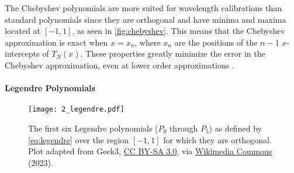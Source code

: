 

The Chebyshev polynomials are more suited for wavelength calibrations than standard polynomials since they are orthogonal and have minima and maxima located at $[-1, 1]$, as seen in \autoref{fig:chebyshev}. This means that the Chebyshev approximation is exact when $x = x_{n}$, where $x_{n}$ are the positions of the $n - 1$ $x$-intercepts of $T_{N}(x)$. These properties greatly minimize the error in the Chebyshev approximation, even at lower order approximations \citep{cheby}.


\paragraph{Legendre Polynomials}

\begin{figure}[t]
    \centering
    \texttt{[image: 2\_legendre.pdf]}
    \caption{The first six Legendre polynomials ($P_0$ through $P_{5}$) as defined by \autoref{eq:legendre} over the region $[-1, 1]$ for which they are orthogonal. Plot adapted from Geek3, \protect\href{https://creativecommons.org/licenses/by-sa/3.0}{CC BY-SA 3.0}, via \protect\href{https://commons.wikimedia.org/wiki/File:Legendrepolynomials6.svg}{Wikimedia Commons} (2023).}
    \label{fig:legendre}
\end{figure}

